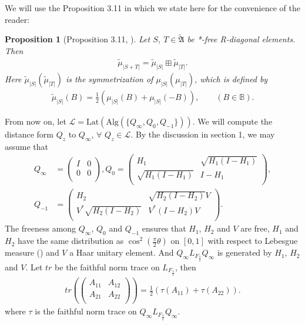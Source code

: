 \documentclass{amsart}
\newcommand{\AAA}{\mathfrak A}
\newcommand{\LLL}{\mathcal L} %
\newcommand{\Lat}{\mathrm{Lat}}
\newcommand{\Alg}{\mathrm{Alg}}
\newtheorem{prop}{Proposition}[section]
\begin{document}
We will use the Proposition 3.11 in \cite{HH} which we state here for the convenience of the reader:

\begin{prop}[Proposition 3.11, \cite{HH}] \label{3prop1}
Let $S$, $T \in \widetilde{\AAA}$ be *-free R-diagonal elements.
Then
\begin{align*}
\widetilde{\mu}_{|S+T|} = \widetilde{\mu}_{|S|}\boxplus \widetilde{\mu}_{|T|}.
\end{align*}
Here $\widetilde{\mu}_{|S|}(\widetilde{\mu}_{|T|})$ is the symmetrization of $\mu_{|S|} (\mu_{|T|})$, which is defined by 
\begin{align*}
\widetilde{\mu}_{|S|}(B) = \frac{1}{2}(\mu_{|S|}(B) + \mu_{|S|}(-B)), \qquad (B \in \mathbb{B}).
\end{align*}
\end{prop}

From now on, let $\LLL = \Lat(\Alg( \{ Q_{\infty},  Q_{0}, Q_{-1} \}))$. We will compute the distance form $Q_{z}$ to $Q_{\infty}$, $\forall$ $Q_{z} \in \LLL$.
By the discussion in section 1, we may assume that 
\begin{align*}
Q_{\infty}&= \left(
        \begin{array}{cc}
          I & 0 \\
          0 & 0 \\
        \end{array}
      \right),
Q_{0} = \left(
          \begin{array}{cc}
            H_{1} & \sqrt{H_{1}(I-H_{1})} \\
            \sqrt{H_{1}(I-H_{1})} & I-H_{1} \\
          \end{array}
        \right) , \\
Q_{-1}&= \left(
          \begin{array}{cc}
            H_{2} & \sqrt{H_{2}(I-H_{2})}V \\
            V^{*}\sqrt{H_{2}(I-H_{2})} & V^{*}(I-H_{2})V \\
          \end{array}
        \right).
\end{align*}
The freeness among  $Q_{\infty}$, $Q_{0}$ and $Q_{-1} $ ensures that $H_1$, $H_2$ and $V$ are free, 
$H_1$ and $H_2$ have the same distribution as $\cos^{2}(\frac{\pi}{2} \theta)$ on $[ 0, 1 ]$ with 
respect to Lebesgue measure (\cite[Exmaple 3.6.7]{VDN}) and $V$ a Haar unitary element. And $Q_{\infty} L_{F_{\frac{3}{2}}} Q_{\infty}$ is 
generated by $H_1$, $H_2$ and $V$. Let $tr$ be the faithful norm trace on $ L_{F_{\frac{3}{2}}}$, then 
\begin{align*}
tr\left (\left(
     \begin{array}{cc}
       A_{11} & A_{12} \\
       A_{21} & A_{22} \\
     \end{array}
   \right) \right) = \frac{1}{2}(\tau(A_{11}) + \tau(A_{22})).
\end{align*}
where $\tau$ is the faithful norm trace on $Q_{\infty} L_{F_{\frac{3}{2}}} Q_{\infty}$.
\end{document}
